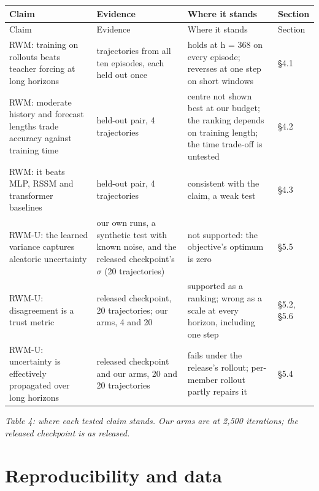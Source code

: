 \documentclass[10pt]{article}
\begin{document}
\begingroup\small
\begin{longtable}{>{\raggedright\arraybackslash}p{}>{\raggedright\arraybackslash}p{}>{\raggedright\arraybackslash}p{}>{\raggedright\arraybackslash}p{}}
\toprule Claim & Evidence & Where it stands & Section \\ \midrule\endfirsthead
\toprule Claim & Evidence & Where it stands & Section \\ \midrule\endhead
\bottomrule\endlastfoot
RWM: training on rollouts beats teacher forcing at long horizons & 20 trajectories from all ten episodes, each held out once & holds at h = 368 on every episode; reverses at one step on short windows & \S{}4.1 \\
RWM: moderate history and forecast lengths trade accuracy against training time & held-out pair, 4 trajectories & centre not shown best at our budget; the ranking depends on training length; the time trade-off is untested & \S{}4.2 \\
RWM: it beats MLP, RSSM and transformer baselines & held-out pair, 4 trajectories & consistent with the claim, a weak test & \S{}4.3 \\
RWM-U: the learned variance captures aleatoric uncertainty & our own runs, a synthetic test with known noise, and the released checkpoint's $\sigma$ (20 trajectories) & not supported: the objective's optimum is zero & \S{}5.5 \\
RWM-U: disagreement is a trust metric & released checkpoint, 20 trajectories; our arms, 4 and 20 & supported as a ranking; wrong as a scale at every horizon, including one step & \S{}5.2, \S{}5.6 \\
RWM-U: uncertainty is effectively propagated over long horizons & released checkpoint and our arms, 20 and 20 trajectories & fails under the release's rollout; per-member rollout partly repairs it & \S{}5.4 \\
\end{longtable}\endgroup

\emph{Table 4: where each tested claim stands. Our arms are at 2,500 iterations; the released checkpoint is as released.}

\section*{Reproducibility and data}
\end{document}
